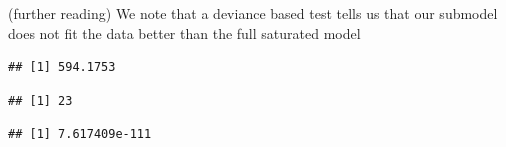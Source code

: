 \documentclass[
  ignorenonframetext,
]{beamer}
\newenvironment{Shaded}{\begin{snugshade}}{\end{snugshade}}
\newcommand{\AttributeTok}[1]{\textcolor[rgb]{0.77,0.63,0.00}{#1}}
\newcommand{\ConstantTok}[1]{\textcolor[rgb]{0.00,0.00,0.00}{#1}}
\newcommand{\DocumentationTok}[1]{\textcolor[rgb]{0.56,0.35,0.01}{\textbf{\textit{#1}}}}
\newcommand{\FunctionTok}[1]{\textcolor[rgb]{0.00,0.00,0.00}{#1}}
\newcommand{\NormalTok}[1]{#1}
\newcommand{\SpecialCharTok}[1]{\textcolor[rgb]{0.00,0.00,0.00}{#1}}
\begin{document}
\begin{frame}[fragile]{(further reading)}
\protect\hypertarget{further-reading}{}
We note that a deviance based test tells us that our submodel does not
fit the data better than the full saturated model

\tiny

\begin{Shaded}
\end{Shaded}

\begin{verbatim}
## [1] 594.1753
\end{verbatim}

\begin{Shaded}
\end{Shaded}

\begin{verbatim}
## [1] 23
\end{verbatim}

\begin{Shaded}
\end{Shaded}

\begin{verbatim}
## [1] 7.617409e-111
\end{verbatim}
\end{frame}
\end{document}
